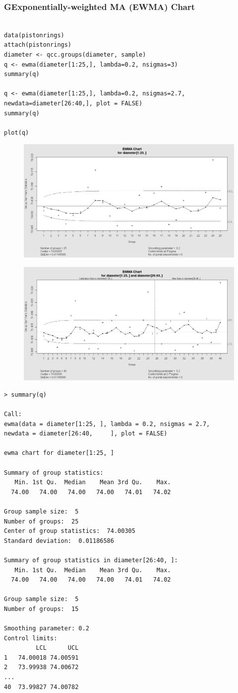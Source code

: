 \documentclass[]{report}
\begin{document}
\subsubsection{GExponentially-weighted MA (EWMA) Chart}
\begin{framed}
\begin{verbatim}

data(pistonrings)
attach(pistonrings)
diameter <- qcc.groups(diameter, sample)
q <- ewma(diameter[1:25,], lambda=0.2, nsigmas=3)
summary(q)

q <- ewma(diameter[1:25,], lambda=0.2, nsigmas=2.7,
newdata=diameter[26:40,], plot = FALSE)
summary(q)

plot(q)
\end{verbatim}
\end{framed}

\begin{figure}[h!]
\centering
\includegraphics[width=0.6\linewidth]{./qccEWMA1}
\caption{}
\label{fig:qccEWMA1}
\end{figure}
\begin{figure}[h!]
\centering
\includegraphics[width=0.6\linewidth]{./qccEWMA2}
\caption{}
\label{fig:qccEWMA2}
\end{figure}
\begin{verbatim}
> summary(q)

Call:
ewma(data = diameter[1:25, ], lambda = 0.2, nsigmas = 2.7, 
newdata = diameter[26:40,     ], plot = FALSE)

ewma chart for diameter[1:25, ] 

Summary of group statistics:
   Min. 1st Qu.  Median    Mean 3rd Qu.    Max. 
  74.00   74.00   74.00   74.00   74.01   74.02 

Group sample size:  5
Number of groups:  25
Center of group statistics:  74.00305
Standard deviation:  0.01186586 

Summary of group statistics in diameter[26:40, ]:
   Min. 1st Qu.  Median    Mean 3rd Qu.    Max. 
  74.00   74.00   74.00   74.00   74.01   74.02 

Group sample size:  5
Number of groups:  15 

Smoothing parameter: 0.2 
Control limits:
         LCL      UCL
1   74.00018 74.00591
2   73.99938 74.00672
...                  
40  73.99827 74.00782

\end{verbatim}
\newpage
\end{document}
